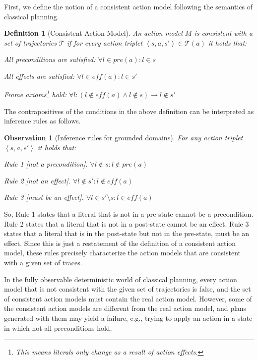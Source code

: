 \documentclass{article}
\newtheorem{observation}{Observation}
\newtheorem{definition}{Definition}
\newcommand{\tuple}[1]{\ensuremath{\left \langle #1 \right \rangle }}
\newcommand{\pre}{\textit{pre}}
\newcommand{\eff}{\textit{eff}}
\begin{document}
First, we define the notion of a consistent action model following the semantics of classical planning. 
\begin{definition}[Consistent Action Model]\label{def:consistent}
An action model $M$ is consistent with a set of trajectories $\mathcal{T}$ 
if for every action triplet $\tuple{s,a,s'}\in \mathcal{T}(a)$ 
it holds that:
\begin{compactenum}
    \item All preconditions are satisfied: $\forall l\in \pre(a) : l\in s$
    \item All effects are satisfied: $\forall l\in \eff(a) : l\in s'$
    \item Frame axioms\footnote{This means literals only change as a result of action effects.} hold: $\forall l : (l\notin \eff(a) \wedge l\notin s) \rightarrow l\notin s'$
\end{compactenum}
\end{definition}
\noindent
The contrapositives of the conditions in the above definition can be interpreted as inference rules as follows. 
\begin{observation}[Inference rules for grounded domains]\label{obs:sam-rules-grounded}
For any action triplet $\tuple{s,a,s'}$ it holds that:
\begin{compactitem}
    \item Rule 1 [not a precondition].  $\forall l \notin s: l \notin \pre(a)$
    \item Rule 2 [not an effect].  $\forall l \notin s': l \notin \eff(a)$
    \item Rule 3 [must be an effect].  $\forall l \in s'\setminus s: l \in \eff(a)$
\end{compactitem}
\end{observation}
\noindent
So, Rule 1 states that a literal that is not in a pre-state cannot be a precondition. 
Rule 2 states that a literal that is not in a post-state cannot be an effect. 
Rule 3 states that a literal that is in the post-state but not in the pre-state, must be an effect. 
Since this is just a restatement of the definition of a consistent action model, these rules precisely characterize the action models that are consistent with a given set of traces.

In the fully observable deterministic world of classical planning, every action model that is not consistent with the given set of trajectories is false, and the set of consistent action models must contain the real action model. However, some of the consistent action models are different from the real action model, and plans generated with them may yield a failure, e.g., trying to apply an action in a state in which not all preconditions hold. 
\end{document}
